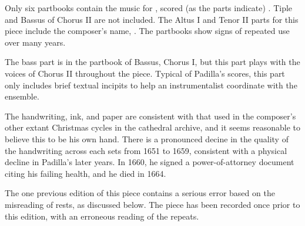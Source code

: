 Only six partbooks contain the music for , 
scored (as the parts indicate) .
Tiple and Bassus of Chorus II are not included.
The Altus I and Tenor II parts for this piece include the composer's name, 
.
The partbooks show signs of repeated use over many years.

The bass part is in the partbook of Bassus, Chorus I, but this part plays with 
the voices of Chorus II throughout the piece.
Typical of Padilla's scores, this part only includes brief textual
incipits to help an instrumentalist coordinate with the ensemble.

The handwriting, ink, and paper are consistent with that used in the composer's
other extant Christmas cycles in the cathedral archive, and it seems reasonable
to believe this to be his own hand.
There is a pronounced decine in the quality of the handwriting across each sets
from 1651 to 1659, consistent with a physical decline in Padilla's later
years.
In 1660, he signed a power-of-attorney document citing his failing 
health\autocite{Mauleon:PadillaCivil}, and he died in 1664.

The one previous edition of this piece contains a serious error based on the 
misreading of rests, as discussed below.%
    \Autocite{Padilla:Tello}
The piece has been recorded once prior to this edition, with an erroneous 
reading of the repeats.%
  \autocite{Padilla:HabanaCD}

